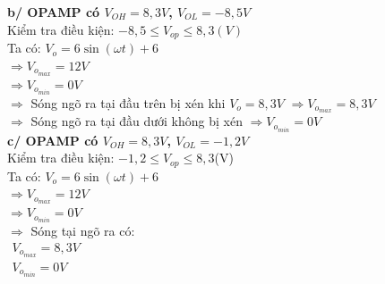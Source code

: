 \begin{flushleft}
\textbf{b/ OPAMP có $V_{OH} = 8{,}3V$, $V_{OL} = -8{,}5V$}\\[6pt]
Kiểm tra điều kiện: $-8{,}5 \le V_{op} \le 8{,}3 (V)$\\[6pt]
Ta có: $V_o = 6\sin(\omega t) + 6$\\[4pt]
$\Rightarrow V_{o_{max}} = 12V$\\[2pt]
$\Rightarrow V_{o_{min}} = 0V$\\[6pt]

$\Rightarrow$ Sóng ngõ ra tại đầu trên bị xén khi $V_o = 8{,}3V$ $\Rightarrow V_{o_{max}} = 8{,}3V$\\[4pt]
$\Rightarrow$ Sóng ngõ ra tại đầu dưới không bị xén $\Rightarrow V_{o_{min}} = 0V$\\[10pt]


\textbf{c/ OPAMP có $V_{OH} = 8{,}3V$, $V_{OL} = -1{,}2V$}\\[6pt]
Kiểm tra điều kiện: $-1{,}2 \le V_{op} \le 8{,}3  $(V)$ $\\[6pt]
Ta có: $V_o = 6\sin(\omega t) + 6$\\[4pt]
$\Rightarrow V_{o_{max}} = 12V$\\[2pt]
$\Rightarrow V_{o_{min}} = 0V$\\[6pt]

$\Rightarrow$ Sóng tại ngõ ra có:\\[2pt]
$\boxed{
\begin{array}{l}
V_{o_{max}} = 8{,}3V\\
V_{o_{min}} = 0V
\end{array}
}$\\[10pt]
\end{flushleft}
